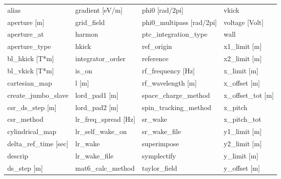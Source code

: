  \begin{tabular}{llll} \toprule
alias                            & gradient [eV/m]                  & phi0 [rad/2pi]                   & vkick                            \\
aperture [m]                     & grid_field                       & phi0_multipass [rad/2pi]         & voltage [Volt]                   \\
aperture_at                      & harmon                           & ptc_integration_type             & wall                             \\
aperture_type                    & hkick                            & ref_origin                       & x1_limit [m]                     \\
bl_hkick [T*m]                   & integrator_order                 & reference                        & x2_limit [m]                     \\
bl_vkick [T*m]                   & is_on                            & rf_frequency [Hz]                & x_limit [m]                      \\
cartesian_map                    & l [m]                            & rf_wavelength [m]                & x_offset [m]                     \\
create_jumbo_slave               & lord_pad1 [m]                    & space_charge_method              & x_offset_tot [m]                 \\
csr_ds_step [m]                  & lord_pad2 [m]                    & spin_tracking_method             & x_pitch                          \\
csr_method                       & lr_freq_spread [Hz]              & sr_wake                          & x_pitch_tot                      \\
cylindrical_map                  & lr_self_wake_on                  & sr_wake_file                     & y1_limit [m]                     \\
delta_ref_time [sec]             & lr_wake                          & superimpose                      & y2_limit [m]                     \\
descrip                          & lr_wake_file                     & symplectify                      & y_limit [m]                      \\
ds_step [m]                      & mat6_calc_method                 & taylor_field                     & y_offset [m]                     \\

\end{tabular}
